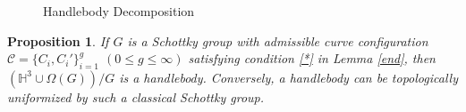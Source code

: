 \documentclass[12pt]{amsart}
\theoremstyle{plain}
\newtheorem{prop}[thm]{Proposition}
\begin{document}
\begin{figure}[t]
\begin{center}
\vspace{.0cm}
\end{center}
\caption{Handlebody Decomposition}\label{fig: Handlebody}

\end{figure}%


\begin{prop} \label{prop: Schottky group iff handlebody}
If $G$ is a Schottky group with admissible curve configuration ${\mathcal C}=\{C_i,C_i'\}_{i=1}^g$ $(0 \leq g \leq \infty)$
satisfying condition \eqref{*} in Lemma \ref{end}, then 
$\left(\mathbb{H}^{3} \cup \Omega (G) \right)/G$ is a handlebody.
Conversely, a  handlebody can be topologically uniformized by such a classical Schottky group. 
\end{prop}
\end{document}
